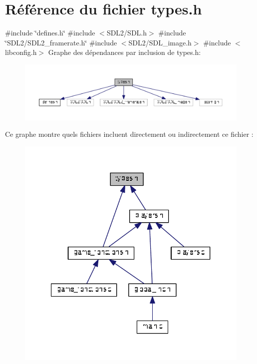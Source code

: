 \section{Référence du fichier types.\+h}
\label{types_8h}
{\ttfamily \#include \char`\"{}defines.\+h\char`\"{}}\newline
{\ttfamily \#include $<$S\+D\+L2/\+S\+D\+L.\+h$>$}\newline
{\ttfamily \#include \char`\"{}S\+D\+L2/\+S\+D\+L2\+\_\+framerate.\+h\char`\"{}}\newline
{\ttfamily \#include $<$S\+D\+L2/\+S\+D\+L\+\_\+image.\+h$>$}\newline
{\ttfamily \#include $<$libconfig.\+h$>$}\newline
Graphe des dépendances par inclusion de types.\+h\+:
\nopagebreak
\begin{figure}[H]
\begin{center}
\leavevmode
\includegraphics[width=350pt]{types_8h__incl}
\end{center}
\end{figure}
Ce graphe montre quels fichiers incluent directement ou indirectement ce fichier \+:
\nopagebreak
\begin{figure}[H]
\begin{center}
\leavevmode
\includegraphics[width=321pt]{types_8h__dep__incl}
\end{center}
\end{figure}
